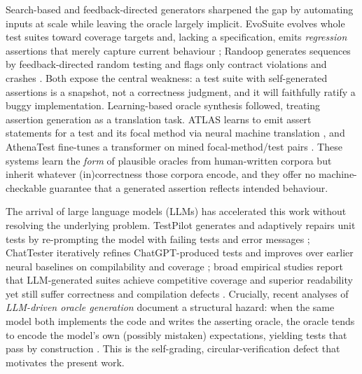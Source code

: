 Search-based and feedback-directed generators sharpened the gap by automating
inputs at scale while leaving the oracle largely implicit. EvoSuite evolves
whole test suites toward coverage targets and, lacking a specification, emits
\emph{regression} assertions that merely capture current behaviour
\citep{fraser2011evosuite}; Randoop generates sequences by feedback-directed
random testing and flags only contract violations and crashes
\citep{pacheco2007randoop}. Both expose the central weakness: a test suite with
self-generated assertions is a snapshot, not a correctness judgment, and it
will faithfully ratify a buggy implementation. Learning-based oracle synthesis
followed, treating assertion generation as a translation task. ATLAS learns to
emit assert statements for a test and its focal method via neural machine
translation \citep{watson2020atlas}, and AthenaTest fine-tunes a transformer on
mined focal-method/test pairs \citep{tufano2020athenatest}. These systems learn
the \emph{form} of plausible oracles from human-written corpora but inherit
whatever (in)correctness those corpora encode, and they offer no machine-
checkable guarantee that a generated assertion reflects intended behaviour.

The arrival of large language models (LLMs) has accelerated this work without
resolving the underlying problem. TestPilot generates and adaptively repairs
unit tests by re-prompting the model with failing tests and error messages
\citep{schafer2024testpilot}; ChatTester iteratively refines ChatGPT-produced
tests and improves over earlier neural baselines on compilability and coverage
\citep{yuan2024chattester}; broad empirical studies report that LLM-generated
suites achieve competitive coverage and superior readability yet still suffer
correctness and compilation defects \citep{siddiq2024empirical}. Crucially,
recent analyses of \emph{LLM-driven oracle generation} document a structural
hazard: when the same model both implements the code and writes the asserting
oracle, the oracle tends to encode the model's own (possibly mistaken)
expectations, yielding tests that pass by construction
\citep{liu2026oracle}. This is the self-grading, circular-verification defect
that motivates the present work.

